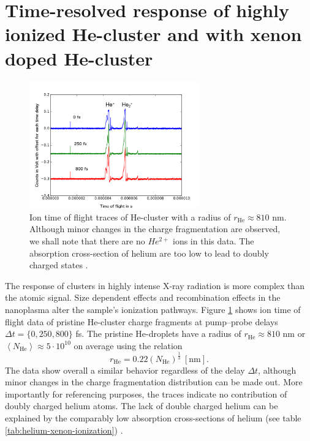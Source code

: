 \section[Time-resolved response of highly ionized He- and HeXe-cluster]{Time-resolved response of highly ionized He-cluster and with xenon doped He-cluster}\label{sec:hexe--and-he-TOF}
\begin{figure}
	\centering
		\includegraphics[width=0.65\textwidth]{images/results/TOF-helium-cluster.png}
	\caption[Time-resolved answer of He-cluster in TOF spectroscopy.]{Ion time of flight traces of He-cluster with a radius of $r_{\text{He}}\approx 810$ nm. Although minor changes in the charge fragmentation are observed, we shall note that there are no $He^{2+}$ ions in this data. The absorption cross-section of helium are too low to lead to doubly charged states \citep{Ho-2016-PC}.}
	\label{fig:TOF-helium-cluster}
\end{figure}
The response of clusters in highly intense X-ray radiation is more complex than the atomic signal. Size dependent effects \citep{Schorb-2012-PRL,Schutte-2015-JPhysB} and recombination effects in the nanoplasma \citep{Schutte-2014-PRL} alter the sample's ionization pathways. Figure \ref{fig:TOF-helium-cluster} shows ion time of flight data of pristine He-cluster charge fragments at pump--probe delays $\Delta t=\{0, 250, 800\}$ fs. The pristine He-droplets have a radius of $r_{\text{He}}\approx 810$ nm or $\left\langle N_{\text{He}}\right\rangle\approx 5\cdot 10^{10}$ on average using the relation \citep{Gomez-2011-JCP}
\begin{equation}
r_{\text{He}}=0.22 (N_{\text{He}})^{\frac{1}{3}}\ [\text{nm}].
\end{equation}
The data show overall a similar behavior regardless of the delay $\Delta t$, although minor changes in the charge fragmentation distribution can be made out. More importantly for referencing purposes, the traces indicate no contribution of doubly charged helium atoms. The lack of double charged helium can be explained by the comparably low absorption cross-sections of helium (see table \ref{tab:helium-xenon-ionization}) \citep{Ho-2016-PC}.\\
